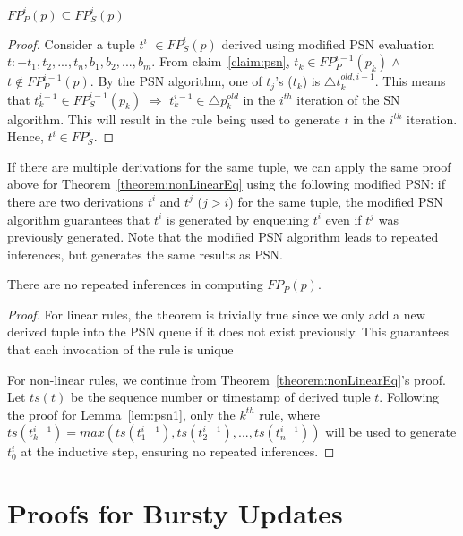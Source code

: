 \begin{Lem}\label{lem:psn2}$FP_{P}^{i}(p) \subseteq FP_{S}^{i}(p)$\end{Lem}
\begin{proof} Consider a tuple $t^{i}$ $\in FP_{S}^{i}(p)$
  derived using modified PSN evaluation $t :- t_{1},t_{2},...,t_{n},b_{1},
  b_{2},...,b_{m}$. From claim~\ref{claim:psn}, $t_{k} \in
  FP_{P}^{i-1}(p_{k})$ $\wedge$ $t \notin FP_{P}^{i-1}(p)$.  By the PSN
  algorithm, one of $t_{j}$'s ($t_{k}$) is $\triangle t_{k}^{old,i-1}$. This means
  that $t_{k}^{i-1} \in FP^{i-1}_{S}(p_{k})$ $\Rightarrow$ $t_{k}^{i-1}
  \in \triangle p_{k}^{old}$ in the $i^{th}$ iteration of the SN
  algorithm. This will result in the rule being used to generate $t$ in
  the $i^{th}$ iteration. Hence, $t^{i} \in FP_{S}^{i}$. 
\end{proof}

If there are multiple derivations for the same tuple, we can apply the same proof above for
Theorem~\ref{theorem:nonLinearEq} using the following
modified PSN: if there are two derivations
$t^{i}$ and $t^{j}$ ($j \gt i$) for the same tuple, the modified PSN algorithm
guarantees that $t^{i}$ is generated by enqueuing $t^{i}$ even if $t^{j}$ was previously
generated. Note that the modified PSN algorithm leads to repeated inferences, but generates
the same results as PSN. 

\begin{Theorem}\label{theorem:dupnl}There are no repeated inferences in computing
  $FP_{P}(p)$.\end{Theorem}

\begin{proof} For linear rules, the theorem is trivially true since we
  only add a new derived tuple into the PSN queue if it does not exist
  previously. This guarantees that each invocation of the rule is unique

For non-linear rules, we continue from Theorem~\ref{theorem:nonLinearEq}'s
  proof. Let $ts(t)$ be the sequence number or timestamp of derived
  tuple $t$. Following the proof for Lemma~\ref{lem:psn1}, only the
  $k^{th}$ rule, where $ts(t^{i-1}_{k}) = max(ts(t^{i-1}_{1}),
  ts(t^{i-1}_{2}), ..., ts(t^{i-1}_{n}))$ will be used to generate
  $t^{i}_{0}$ at the inductive step, ensuring no repeated inferences.\end{proof}


\section{Proofs for Bursty Updates}
\label{appendix:bursty}
\label{appendix:burstyCentral}
\label{appendix:burstyDistributed}


